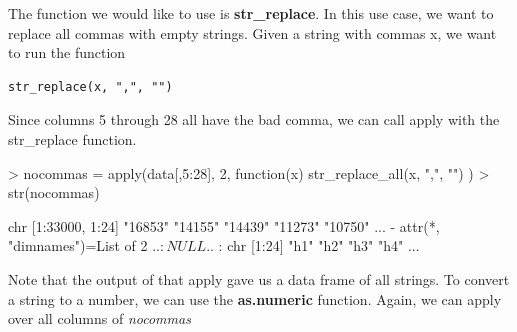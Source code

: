 \documentclass{article}
\begin{document}
The function we would like to use is \textbf{str\_replace}.  In this use case, we want
to replace all commas with empty strings.  Given a string with commas x, we want
to run the function

\begin{verbatim}
str_replace(x, ",", "")
\end{verbatim}

Since columns 5 through 28 all have the bad comma, we can call apply with the
str\_replace function.

\begin{Schunk}
\begin{Sinput}
> nocommas = apply(data[,5:28], 2, function(x) { str_replace_all(x, ",", "") } )
> str(nocommas)
\end{Sinput}
\begin{Soutput}
 chr [1:33000, 1:24] "16853" "14155" "14439" "11273" "10750" ...
 - attr(*, "dimnames")=List of 2
  ..$ : NULL
  ..$ : chr [1:24] "h1" "h2" "h3" "h4" ...
\end{Soutput}
\end{Schunk}

Note that the output of that apply gave us a data frame of all strings.
To convert a string to a number, we can use the \textbf{as.numeric} function.
Again, we can apply over all columns of \textit{nocommas}
\end{document}
